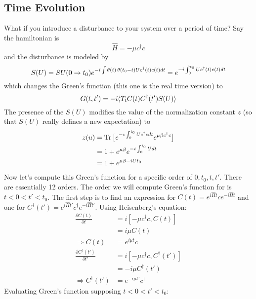 \documentclass{article}
\begin{document}
\subsection{Time Evolution}
What if you introduce a disturbance to your system over a period of time? Say the hamiltonian is \begin{equation*} \hat{H} = -\mu c^\dagger c \end{equation*} and the disturbance is modeled by 
\begin{equation*} S(U) = SU(0 \rightarrow t_0) e^{-i \int \operatorname{\theta}(t)\operatorname{\theta}(t_0 - t) U c^\dagger(t) c(t) dt} = e^{-i \int_0^{t_0}U c^\dagger (t) c(t) dt} \end{equation*} 
which changes the Green's function (this one is the real time version) to 
\begin{equation*}G(t, t') = -i\langle T_t C(t)C^\dagger(t') S(U) \rangle \end{equation*}
The presence of the $S(U)$ modifies the value of the normalization constant $z$ (so that $S(U)$ really defines a new expectation) to 
\begin{align*}
z(u) &= \operatorname{Tr} \big[ e^{-i\int_0^{t_0} Uc^\dagger c dt} e^{\mu\beta c^\dagger c} \big] \\
&= 1 + e^{\mu\beta} e^{-i\int_0^{t_0} U dt} \\
&= 1 + e^{\mu\beta - iUt_0}
\end{align*}
Now let's compute this Green's function for a specific order of $0, t_0, t, t'$. There are essentially 12 orders. The order we will compute Green's function for is $t < 0 < t' < t_0$. The first step is to find an expression for $C(t) = e^{i\hat{H}t}c e^{-i\hat{H}t}$ and one for $C^\dagger(t') = e^{i\hat{H}t'}c^\dagger e^{-i\hat{H}t'}$. Using Heisenberg's equation:
\begin{align*}
\frac{\partial C(t)}{\partial t} &= i[-\mu c^\dagger c, C(t)] \\
&= i \mu C(t) \\
\Rightarrow C(t) &= e^{i\mu t} c \\
\frac{\partial C^\dagger(t')}{\partial t'} &= i[-\mu c^\dagger c, C^\dagger(t')] \\
&= -i \mu C^\dagger(t') \\
\Rightarrow C^\dagger(t') &= e^{-i\mu t'} c^\dagger
\end{align*}
Evaluating Green's function supposing $t < 0 < t' < t_0$:
\end{document}

